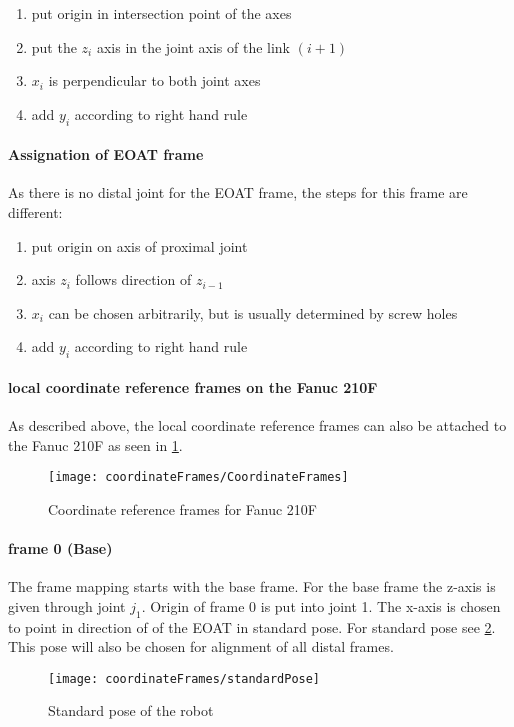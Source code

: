 \begin{itemize}[wide=\parindent]
		\begin{enumerate}[label=\emph{\alph*)}]
		\item put origin in intersection point of the axes
		\item put the $z_i$ axis in the joint axis of the link $(i+1)$
		\item $x_i$ is perpendicular to both joint axes
		\item add $y_i$ according to right hand rule
	\end{enumerate}
\end{itemize}

\paragraph{Assignation of \ac{EOAT} frame}
As there is no distal joint for the \ac{EOAT} frame, the steps for this frame are different:

\begin{enumerate}[label=\emph{\alph*)}]
	\item put origin on axis of proximal joint 
	\item axis $z_i$ follows direction of $z_{i-1}$
	\item $x_i$ can be chosen arbitrarily, but is usually determined by screw holes
	\item add $y_i$ according to right hand rule
\end{enumerate}

\paragraph{local coordinate reference frames on the Fanuc 210F}

As described above, the local coordinate reference frames can also be attached to the Fanuc 210F as seen in \ref{fig:RefFrame}. 

\begin{figure}[H]
	\texttt{[image: coordinateFrames/CoordinateFrames]}
	\caption{Coordinate reference frames for Fanuc 210F}
	\label{fig:RefFrame}
\end{figure}

\paragraph{frame 0 (Base)}
The frame mapping starts with the base frame. For the base frame the z-axis is given through joint $j_1$. Origin of frame 0 is put into joint 1.
The x-axis is chosen to point in direction of of the \ac{EOAT} in standard pose. For standard pose see \ref{fig:StandardPose}.
This pose will also be chosen for alignment of all distal frames.
\begin{figure}[h]
	\texttt{[image: coordinateFrames/standardPose]}
	\caption{Standard pose of the robot}
	\label{fig:StandardPose}
\end{figure}

